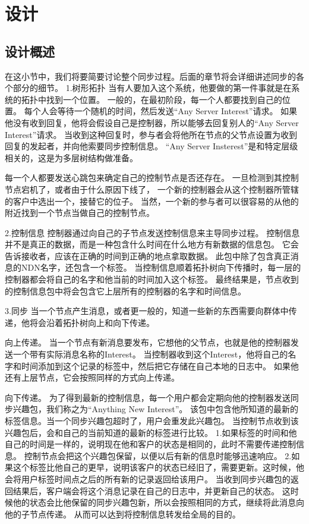 \documentclass[a4paper]{article}
\begin{document}
\section{设计}

\subsection{设计概述}
在这小节中，我们将要简要讨论整个同步过程。后面的章节将会详细讲述同步的各个部分的细节。
1.树形拓扑
当有人要加入这个系统，他要做的第一件事就是在系统的拓扑中找到一个位置。
一般的，在最初阶段，每一个人都要找到自己的位置。
每个人会等待一个随机的时间，然后发送“Any Server Interest”请求。
如果他没有收到回复，他将会假设自己是控制器，所以能够去回复别人的“Any Server Interest”请求。
当收到这种回复时，参与者会将他所在节点的父节点设置为收到回复的发起者，并向他索要同步控制信息。
“Any Server Insterest”是和特定层级相关的，这是为多层树结构做准备。

每一个人都要发送心跳包来确定自己的控制节点是否还存在。
一旦检测到其控制节点宕机了，或者由于什么原因下线了，
一个新的控制器会从这个控制器所管辖的客户中选出一个，接替它的位子。
当然，一个新的参与者可以很容易的从他的附近找到一个节点当做自己的控制节点。

2.控制信息
控制器通过向自己的子节点发送控制信息来主导同步过程。
控制信息并不是真正的数据，而是一种包含什么时间在什么地方有新数据的信息包。
它会告诉接收者，应该在正确的时间到正确的地点拿取数据。
此包中除了包含真正消息的NDN名字，还包含一个标签。
当控制信息顺着拓扑树向下传播时，每一层的控制器都会将自己的名字和他当前的时间加入这个标签。
最终结果是，节点收到的控制信息包中将会包含它上层所有的控制器的名字和时间信息。

3.同步
当一个节点产生消息，或者更一般的，知道一些新的东西需要向群体中传递，他将会沿着拓扑树向上和向下传递。

向上传递。
当一个节点有新消息要发布，它想他的父节点，也就是他的控制器发送一个带有实际消息名称的Interest。
当控制器收到这个Interest，他将自己的名字和时间添加到这个记录的标签中，然后把它存储在自己本地的日志中。
如果他还有上层节点，它会按照同样的方式向上传递。

向下传递。
为了得到最新的控制信息，每一个用户都会定期向他的控制器发送同步兴趣包，我们称之为“Anything New Interest”。
该包中包含他所知道的最新的标签信息。当一个同步兴趣包超时了，用户会重发此兴趣包。
当控制节点收到该兴趣包后，会和自己的当前知道的最新的标签进行比较。
1.如果标签的时间和他自己的时间是一样的，说明现在他和客户的状态是相同的，此时不需要传递控制信息。
控制节点会把这个兴趣包保留，以便以后有新的信息时能够迅速响应。
2.如果这个标签比他自己的更早，说明该客户的状态已经旧了，需要更新。这时候，他会将用户标签时间点之后的所有新的记录返回给该用户。
当收到同步兴趣包的返回结果后，客户端会将这个消息记录在自己的日志中，并更新自己的状态。
这时候他的状态会比他保留的同步兴趣包新，所以会按照相同的方式，继续将此消息向他的子节点传递。
从而可以达到将控制信息转发给全局的目的。
\end{document}
